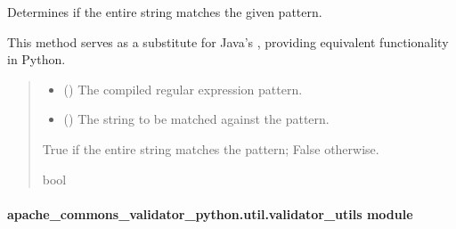 \documentclass[letterpaper,10pt,english]{sphinxmanual}
\begin{document}
\begin{fulllineitems}
\begin{fulllineitems}
\label{\detokenize{apache_commons_validator_python.util:apache_commons_validator_python.util.regex.Regex.pattern_matches}}
\pysigstartsignatures
{}
\pysigstopsignatures
\sphinxAtStartPar
Determines if the entire string matches the given pattern.

\sphinxAtStartPar
This method serves as a substitute for Java’s ,
providing equivalent functionality in Python.
\begin{quote}\begin{description}
\begin{itemize}
\item {} 
\sphinxAtStartPar
{} () \textendash{} The compiled regular expression pattern.

\item {} 
\sphinxAtStartPar
{} () \textendash{} The string to be matched against the pattern.

\end{itemize}

\sphinxAtStartPar
True if the entire string matches the pattern; False otherwise.

\sphinxAtStartPar
bool

\end{description}\end{quote}

\end{fulllineitems}


\end{fulllineitems}



\paragraph{apache\_commons\_validator\_python.util.validator\_utils module}
\label{\detokenize{apache_commons_validator_python.util:module-apache_commons_validator_python.util.validator_utils}}\label{\detokenize{apache_commons_validator_python.util:apache-commons-validator-python-util-validator-utils-module}}
\end{document}
